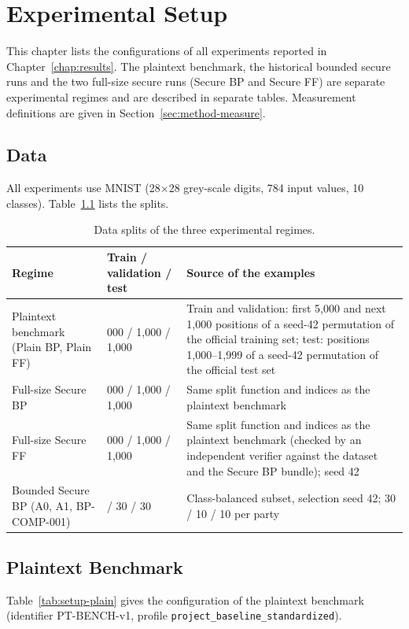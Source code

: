 \chapter{Experimental Setup}\label{chap:setup}

This chapter lists the configurations of all experiments reported in Chapter~\ref{chap:results}. The plaintext benchmark, the historical bounded secure runs and the two full-size secure runs (Secure BP and Secure FF) are separate experimental regimes and are described in separate tables. Measurement definitions are given in Section~\ref{sec:method-measure}.

\section{Data}\label{sec:setup-data}
All experiments use MNIST (28$\times$28 grey-scale digits, 784 input values, 10 classes). Table~\ref{tab:setup-data} lists the splits.

\begin{table}[ht]
\centering
\small
\begin{tabular}{@{}>{\raggedright\arraybackslash}p{3.6cm}>{\raggedright\arraybackslash}p{4.4cm}>{\raggedright\arraybackslash}p{5.8cm}@{}}
\toprule
Regime & Train / validation / test & Source of the examples \\
\midrule
Plaintext benchmark (Plain BP, Plain FF) & 5{,}000 / 1{,}000 / 1{,}000 & Train and validation: first 5{,}000 and next 1{,}000 positions of a seed-42 permutation of the official training set; test: positions 1{,}000--1{,}999 of a seed-42 permutation of the official test set \\
Full-size Secure BP & 5{,}000 / 1{,}000 / 1{,}000 & Same split function and indices as the plaintext benchmark \\
Full-size Secure FF & 5{,}000 / 1{,}000 / 1{,}000 & Same split function and indices as the plaintext benchmark (checked by an independent verifier against the dataset and the Secure BP bundle); seed 42 \\
Bounded Secure BP (A0, A1, BP-COMP-001) & 90 / 30 / 30 & Class-balanced subset, selection seed 42; 30 / 10 / 10 per party \\
\bottomrule
\end{tabular}
\caption{Data splits of the three experimental regimes.}
\label{tab:setup-data}
\end{table}

\section{Plaintext Benchmark}\label{sec:setup-plain}
Table~\ref{tab:setup-plain} gives the configuration of the plaintext benchmark (identifier PT-BENCH-v1, profile \texttt{project\_baseline\_standardized}).


